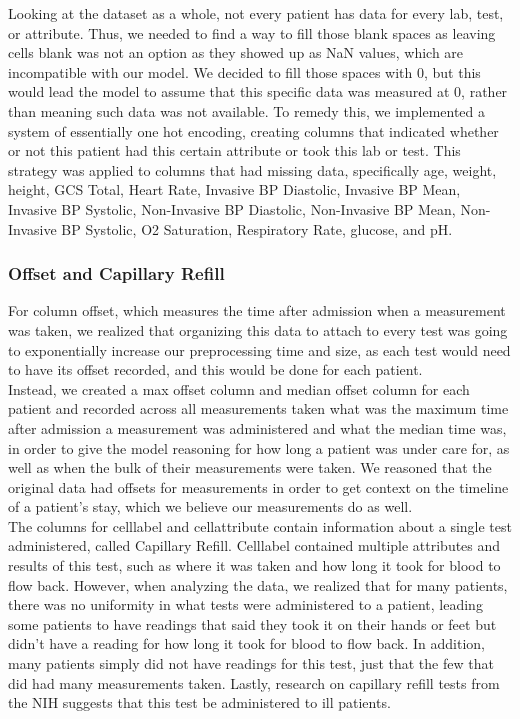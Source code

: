 \documentclass{article}
\begin{document}
Looking at the dataset as a whole, not every patient has data for every lab, test, or attribute. Thus, we needed to find a way to fill those blank spaces as leaving cells blank was not an option as they showed up as NaN values, which are incompatible with our model. We decided to fill those spaces with 0, but this would lead the model to assume that this specific data was measured at 0, rather than meaning such data was not available. To remedy this, we implemented a system of essentially one hot encoding, creating columns that indicated whether or not this patient had this certain attribute or took this lab or test. This strategy was applied to columns that had missing data, specifically age, weight, height, GCS Total, Heart Rate, Invasive BP Diastolic, Invasive BP Mean, Invasive BP Systolic, Non-Invasive BP Diastolic, Non-Invasive BP Mean, Non-Invasive BP Systolic, O2 Saturation, Respiratory Rate, glucose, and pH. \\

\subsubsection{Offset and Capillary Refill}

For column offset, which measures the time after admission when a measurement was taken, we realized that organizing this data to attach to every test was going to exponentially increase our preprocessing time and size, as each test would need to have its offset recorded, and this would be done for each patient. \\

Instead, we created a max offset column and median offset column for each patient and recorded across all measurements taken what was the maximum time after admission a measurement was administered and what the median time was, in order to give the model reasoning for how long a patient was under care for, as well as when the bulk of their measurements were taken. We reasoned that the original data had offsets for measurements in order to get context on the timeline of a patient's stay, which we believe our measurements do as well. \\

The columns for celllabel and cellattribute contain information about a single test administered, called Capillary Refill. Celllabel contained multiple attributes and results of this test, such as where it was taken and how long it took for blood to flow back. However, when analyzing the data, we realized that for many patients, there was no uniformity in what tests were administered to a patient, leading some patients to have readings that said they took it on their hands or feet but didn't have a reading for how long it took for blood to flow back. In addition, many patients simply did not have readings for this test, just that the few that did had many measurements taken. Lastly, research on capillary refill tests from the NIH suggests that this test be administered to ill patients. \\
\end{document}
